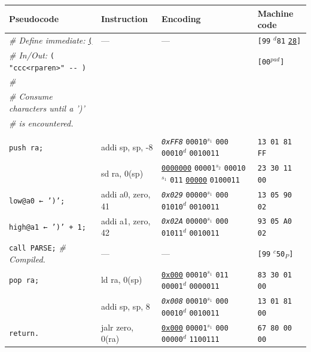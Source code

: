 \documentclass[a4paper,12pt,final]{article}
\begin{document}
\begin{table}[!htbp] \begin{adjustwidth}{-1cm}{-1cm} \fontsize{8}{9.600000}\selectfont
\begin{center}
\begin{tabular}{l|ll|l}
\textbf{Pseudocode} & \textbf{Instruction} & \textbf{Encoding} & \textbf{Machine code}\\[0pt]
\hline
\emph{\# Define immediate:} \uline{\texttt{(}} & --- & --- & \texttt{[99} \(^{d}\)​\texttt{81} \uline{\texttt{28}}​\texttt{]}\\[0pt]
\emph{\# In/Out:} \texttt{( "ccc<rparen>" -​- )} &  &  & \texttt{[00}​\(^{pad}\)​\texttt{]}\\[0pt]
\emph{\#} &  &  & \\[0pt]
\emph{\# Consume characters until a ')'} &  &  & \\[0pt]
\emph{\# is encountered.} &  &  & \\[0pt]
 &  &  & \\[0pt]
\texttt{push ra;} & addi sp, sp, -8 & \emph{\texttt{0xFF8}}                    \texttt{00010}​\(^{s_{1}}\) \texttt{000} \texttt{00010}​\(^{d}\)  \texttt{0010011} & \texttt{13 01 81 FF}\\[0pt]
 & sd ra, 0(sp) & \uline{\texttt{0000000}} \texttt{00001}​\(^{s_{2}}\) \texttt{00010}​\(^{s_{1}}\) \texttt{011} \uline{\texttt{00000}} \texttt{0100011} & \texttt{23 30 11 00}\\[0pt]
\texttt{low@a0 ← ')';} & addi a0, zero, 41 & \emph{\texttt{0x029}}                    \texttt{00000}​\(^{s_{1}}\) \texttt{000} \texttt{01010}​\(^{d}\)  \texttt{0010011} & \texttt{13 05 90 02}\\[0pt]
\texttt{high@a1 ← ')' + 1;} & addi a1, zero, 42 & \emph{\texttt{0x02A}}                    \texttt{00000}​\(^{s_{1}}\) \texttt{000} \texttt{01011}​\(^{d}\)  \texttt{0010011} & \texttt{93 05 A0 02}\\[0pt]
\texttt{call PARSE;}  \emph{\# Compiled.} & --- & --- & \texttt{[99} \(^{c}\)​\texttt{50}​\(_{P}\)​\texttt{]}\\[0pt]
\texttt{pop ra;} & ld ra, 0(sp) & \uline{\texttt{0x000}}                    \texttt{00010}​\(^{s_{1}}\) \texttt{011} \texttt{00001}​\(^{d}\)  \texttt{0000011} & \texttt{83 30 01 00}\\[0pt]
 & addi sp, sp, 8 & \emph{\texttt{0x008}}                    \texttt{00010}​\(^{s_{1}}\) \texttt{000} \texttt{00010}​\(^{d}\)  \texttt{0010011} & \texttt{13 01 81 00}\\[0pt]
\texttt{return.} & jalr zero, 0(ra) & \uline{\texttt{0x000}}                    \texttt{00001}​\(^{s_{1}}\) \texttt{000} \texttt{00000}​\(^{d}\)  \texttt{1100111} & \texttt{67 80 00 00}\\[0pt]
\end{tabular}

\end{center}
\normalsize \end{adjustwidth} \end{table} \vspace{0}
\end{document}
